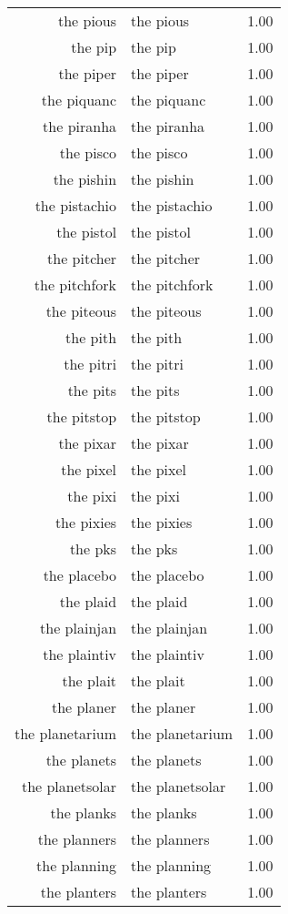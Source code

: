 \begin{table}[ht]
\begin{tabular}{rlr}
  the pious & the pious & 1.00 \\ 
  the pip & the pip & 1.00 \\ 
  the piper & the piper & 1.00 \\ 
  the piquanc & the piquanc & 1.00 \\ 
  the piranha & the piranha & 1.00 \\ 
  the pisco & the pisco & 1.00 \\ 
  the pishin & the pishin & 1.00 \\ 
  the pistachio & the pistachio & 1.00 \\ 
  the pistol & the pistol & 1.00 \\ 
  the pitcher & the pitcher & 1.00 \\ 
  the pitchfork & the pitchfork & 1.00 \\ 
  the piteous & the piteous & 1.00 \\ 
  the pith & the pith & 1.00 \\ 
  the pitri & the pitri & 1.00 \\ 
  the pits & the pits & 1.00 \\ 
  the pitstop & the pitstop & 1.00 \\ 
  the pixar & the pixar & 1.00 \\ 
  the pixel & the pixel & 1.00 \\ 
  the pixi & the pixi & 1.00 \\ 
  the pixies & the pixies & 1.00 \\ 
  the pks & the pks & 1.00 \\ 
  the placebo & the placebo & 1.00 \\ 
  the plaid & the plaid & 1.00 \\ 
  the plainjan & the plainjan & 1.00 \\ 
  the plaintiv & the plaintiv & 1.00 \\ 
  the plait & the plait & 1.00 \\ 
  the planer & the planer & 1.00 \\ 
  the planetarium & the planetarium & 1.00 \\ 
  the planets & the planets & 1.00 \\ 
  the planetsolar & the planetsolar & 1.00 \\ 
  the planks & the planks & 1.00 \\ 
  the planners & the planners & 1.00 \\ 
  the planning & the planning & 1.00 \\ 
  the planters & the planters & 1.00 \\ 

\end{tabular}
\end{table}
